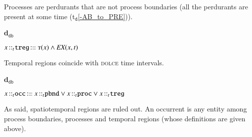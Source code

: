 \documentclass[ao]{iosart2x}
\newcommand{\nb}[1]{\textcolor{red}{$|$}\marginpar{\hspace*{-0cm}\parbox{20mm}{\scriptsize\raggedright\textcolor{red}{#1}}}}
\newcommand{\bfoAxLabel}{\textrm{a$_\texttt{b}$}}
\newcommand{\dolceAxLabel}{\textrm{a$_\texttt{d}$}}
\newcommand{\dolceThrLabel}{\textrm{t$_\texttt{d}$}}
\newcommand{\dbDefLabel}{\textrm{d$_\texttt{db}$}}
\newcounter{cntdbdf}
\newcommand{\dbdf}[1]{\refstepcounter{cntdbdf}\begin{small}{\bf \dbDefLabel\thecntdbdf\label{#1}}\end{small}}
\newcommand{\refdolceax}[1]{({\dolceAxLabel}\ref{#1})}
\newcommand{\refdolceth}[1]{({\dolceThrLabel}\ref{#1})}
\newcommand{\refbfoax}[1]{({\bfoAxLabel}\ref{#1})}
\newcommand{\pr}[1]{\mathtt{#1}}
\newcommand{\prbfo}[1]{{\textit{{#1}}}}
\newcommand{\cn}[1]{\mathtt{#1}}
\newcommand\textequal{%
 \rule[.08ex]{5pt}{0.35pt}\llap{\rule[.78ex]{5pt}{0.35pt}}}
\newcommand{\sdef}{{\hspace{1.5pt}:\hspace{-2.5pt}\textequal\hspace{3pt}}}
\newcommand{\dolce}{{\textsc{dolce}}}
\newcommand{\bfo}{{\textsc{bfo}}}
\newcommand {\ABdcat} {\textsc{ab}}
\newcommand {\PDdcat} {\textsc{pd}}
\newcommand {\Tdcat} {\textsc{t}}
\newcommand {\ATd} {\ensuremath{\pr{AT}}}
\newcommand {\PREd} {\ensuremath{\pr{PRE}}}
\newcommand {\TLCd} {\ensuremath{\pr{TLC}}}
\newcommand{\occbcat}{\cn{occ}}
\newcommand{\procbcat}{\cn{proc}}
\newcommand{\pbndbcat}{\cn{pbnd}}
\newcommand{\tregbcat}{\cn{treg}}
\newcommand{\bfotppart}{\prbfo{tPP}}
\newcommand{\bfoexist}{\prbfo{EX}}
\newcommand{\bfoiof}[1]{{\,::_{#1\:\!}}}
\begin{document}
\vspace{1pt}
Processes are perdurants that are not process boundaries (all the perdurants are present at some time \refdolceth{-AB_to_PRE}).

%

\item[\dbdf{d2b_treg}] $x \bfoiof{t} \tregbcat \sdef \Tdcat(x) \land \bfoexist(x,t)$

\vspace{1pt}
Temporal regions coincide with {\dolce} time intervals.

%
%
%

\item[\dbdf{d2b_occ}] $x \bfoiof{t} \occbcat \sdef x \bfoiof{t} \pbndbcat \lor x \bfoiof{t} \procbcat \lor x \bfoiof{t} \tregbcat$

\vspace{1pt}
As said, spatiotemporal regions are ruled out. An occurrent is any entity among process boundaries, processes and temporal regions (whose definitions are given above).
\end{document}
